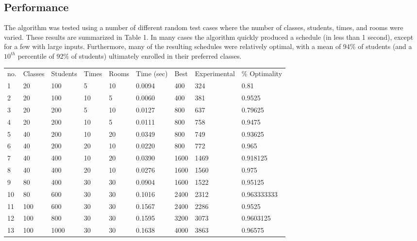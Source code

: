 \documentclass[11pt, oneside]{article}   	%
\begin{document}
\subsection{Performance}
The algorithm was tested using a number of different random test cases where the number of classes, students, times, and rooms were varied. These results are summarized in Table 1. In many cases the algorithm quickly produced a schedule (in less than 1 second), except for a few with large inputs. Furthermore, many of the resulting schedules were relatively optimal, with a mean of 94\% of students (and a $10^{th}$ percentile of 92\% of students) ultimately enrolled in their preferred classes.
\begin{table}[h]
\centering
\begin{tabular}{lllllllll}
no. & Classes & Students & Times & Rooms & Time (sec) & Best   & Experimental & \% Optimality \\
1   & 20      & 100      & 5     & 10    & 0.0094     & 400    & 324          & 0.81         \\
2   & 20      & 100      & 10    & 5     & 0.0060     & 400    & 381          & 0.9525       \\
3   & 20      & 200      & 5     & 10    & 0.0127     & 800    & 637          & 0.79625      \\
4   & 20      & 200      & 10    & 5     & 0.0111     & 800    & 758          & 0.9475       \\
5   & 40      & 200      & 10    & 20    & 0.0349     & 800    & 749          & 0.93625      \\
6   & 40      & 200      & 20    & 10    & 0.0220     & 800    & 772          & 0.965        \\
7   & 40      & 400      & 10    & 20    & 0.0390     & 1600   & 1469         & 0.918125     \\
8   & 40      & 400      & 20    & 10    & 0.0276     & 1600   & 1560         & 0.975        \\
9   & 80      & 400      & 30    & 30    & 0.0904     & 1600   & 1522         & 0.95125      \\
10  & 80      & 600      & 30    & 30    & 0.1016     & 2400   & 2312         & 0.963333333  \\
11  & 100     & 600      & 30    & 30    & 0.1567     & 2400   & 2286         & 0.9525       \\
12  & 100     & 800      & 30    & 30    & 0.1595     & 3200   & 3073         & 0.9603125    \\
13  & 100     & 1000     & 30    & 30    & 0.1638     & 4000   & 3863         & 0.96575      \\

\end{tabular}
\end{table}
\end{document}
